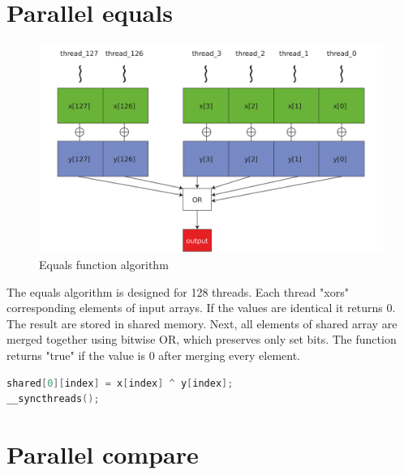 \documentclass[oneside,openright,12pt,final,en]{mgr}
\begin{document}
\section{Parallel equals}
\begin{figure}[H]
	\centering
	\includegraphics[width=\textwidth]{al_equals}
	\caption{Equals function algorithm}
	\label{fig:al_equals}
\end{figure}  

The equals algorithm is designed for 128 threads. Each thread "xors" corresponding elements of input arrays. If the values are identical it returns 0. The result are stored in shared memory. Next, all elements of shared array are merged together using bitwise OR, which preserves only set bits. The function returns "true" if the value is 0 after merging every element.

\begin{lstlisting}[language=cpp]
shared[0][index] = x[index] ^ y[index];
__syncthreads();
\end{lstlisting}


\section{Parallel compare}
\end{document}
